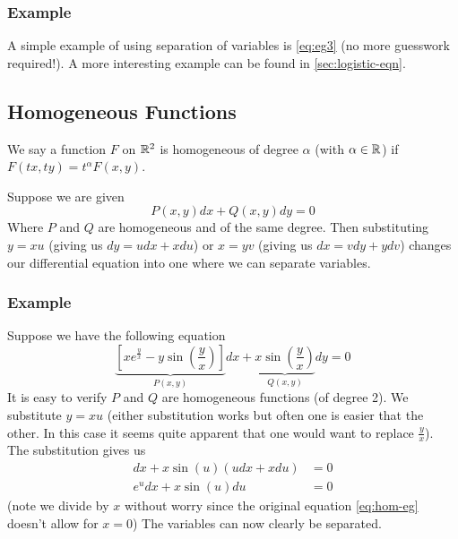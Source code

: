 \subsubsection{Example}
A simple example of using separation of variables is \autoref{eq:eg3} (no more guesswork required!). A more interesting example can be found in \autoref{sec:logistic-eqn}.

\subsection{Homogeneous Functions}
We say a function $F$ on $\mathbb{R}^2$ is homogeneous of degree $\alpha$ (with $\alpha \in \mathbb{R}$) if $F(tx, ty) = t^\alpha F(x, y)$.

Suppose we are given
\begin{equation}
    P(x, y) dx + Q(x, y) dy = 0
\end{equation}
Where $P$ and $Q$ are homogeneous and of the same degree. Then substituting $y = xu$ (giving us $dy = u dx + x du$) or $x = yv$ (giving us $dx = v dy + y dv$) changes our differential equation into one where we can separate variables.

\subsubsection{Example}
Suppose we have the following equation
\begin{equation}\label{eq:hom-eg}
    \underbrace{\left[ x e^{\frac{y}{x}} - y \sin \left(\frac{y}{x} \right) \right]}_{P(x, y)} dx + \underbrace{x \sin\left( \frac{y}{x} \right)}_{Q(x,y)} dy = 0
\end{equation}
It is easy to verify $P$ and $Q$ are homogeneous functions (of degree 2). We substitute $y = xu$ (either substitution works but often one is easier that the other. In this case it seems quite apparent that one would want to replace $\frac{y}{x}$). The substitution gives us
\begin{align*}
    [xe^u - xu \sin(u)] dx + x \sin(u)(u dx + x du) &= 0\\
    e^u dx + x \sin(u) du &= 0
\end{align*}
(note we divide by $x$ without worry since the original equation \autoref{eq:hom-eg} doesn't allow for $x = 0$)
The variables can now clearly be separated.




